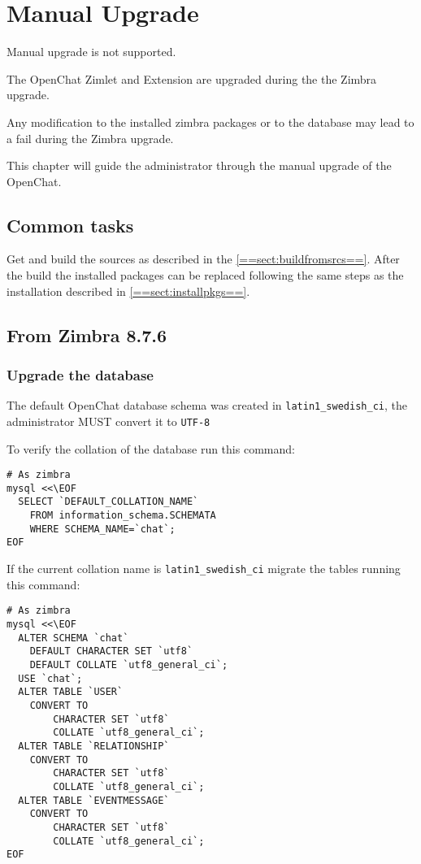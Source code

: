 \section{Manual Upgrade}

\begin{comment}
WARNING:
\end{comment}
\begin{warning}
    Manual upgrade is not supported.

    The OpenChat Zimlet and Extension are upgraded during the the Zimbra upgrade.

    Any modification to the installed zimbra packages or to the database may lead to a fail during the Zimbra upgrade.
\end{warning}

This chapter will guide the administrator through the manual upgrade of the OpenChat.

\subsection{Common tasks}

    Get and build the sources as described in the \ref{==sect:buildfromsrcs==}. After the build the installed packages
    can be replaced following the same steps as the installation described in \ref{==sect:installpkgs==}.

\subsection{From Zimbra 8.7.6}
    \subsubsection{Upgrade the database}

        The default OpenChat database schema was created in \verb+latin1_swedish_ci+, the administrator MUST convert it to \verb+UTF-8+

        To verify the collation of the database run this command:
        \begin{verbatim}
# As zimbra
mysql <<\EOF
  SELECT `DEFAULT_COLLATION_NAME`
    FROM information_schema.SCHEMATA
    WHERE SCHEMA_NAME=`chat`;
EOF
        \end{verbatim}

        If the current collation name is \verb+latin1_swedish_ci+ migrate the tables running this command:
        \begin{verbatim}
# As zimbra
mysql <<\EOF
  ALTER SCHEMA `chat`
    DEFAULT CHARACTER SET `utf8`
    DEFAULT COLLATE `utf8_general_ci`;
  USE `chat`;
  ALTER TABLE `USER`
    CONVERT TO
        CHARACTER SET `utf8`
        COLLATE `utf8_general_ci`;
  ALTER TABLE `RELATIONSHIP`
    CONVERT TO
        CHARACTER SET `utf8`
        COLLATE `utf8_general_ci`;
  ALTER TABLE `EVENTMESSAGE`
    CONVERT TO
        CHARACTER SET `utf8`
        COLLATE `utf8_general_ci`;
EOF
        \end{verbatim}

